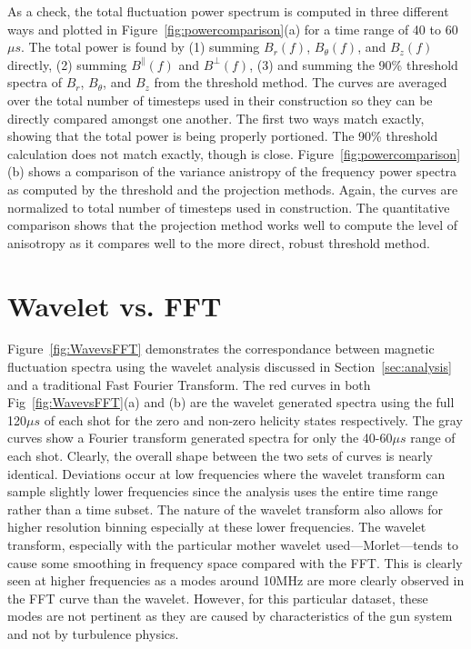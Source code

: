 \documentclass[manuscript]{aastex}
\begin{document}
As a check, the total fluctuation power spectrum is computed in three different ways and plotted in Figure~\ref{fig:powercomparison}(a) for a time range of 40 to 60$\mu s$. The total power is found by (1) summing $B_{r}(f)$, $B_{\theta}(f)$, and $B_{z}(f)$ directly, (2) summing $B^{\parallel}(f)$ and $B^{\perp}(f)$, (3) and summing the 90\% threshold spectra of $B_{r}$, $B_{\theta}$, and $B_{z}$ from the threshold method. The curves are averaged over the total number of timesteps used in their construction so they can be directly compared amongst one another. The first two ways match exactly, showing that the total power is being properly portioned. The 90\% threshold calculation does not match exactly, though is close. Figure~\ref{fig:powercomparison}(b) shows a comparison of the variance anistropy of the frequency power spectra as computed by the threshold and the projection methods. Again, the curves are normalized to total number of timesteps used in construction. The quantitative comparison shows that the projection method works well to compute the level of anisotropy as it compares well to the more direct, robust threshold method.

\section{Wavelet vs. FFT}\label{sec:WaveFFT}

Figure~\ref{fig:WavevsFFT} demonstrates the correspondance between magnetic fluctuation spectra using the wavelet analysis discussed in Section~\ref{sec:analysis} and a traditional Fast Fourier Transform. The red curves in both Fig~\ref{fig:WavevsFFT}(a) and (b) are the wavelet generated spectra using the full 120$\mu s$ of each shot for the zero and non-zero helicity states respectively. The gray curves show a Fourier transform generated spectra for only the 40-60$\mu s$ range of each shot. Clearly, the overall shape between the two sets of curves is nearly identical. Deviations occur at low frequencies where the wavelet transform can sample slightly lower frequencies since the analysis uses the entire time range rather than a time subset. The nature of the wavelet transform also allows for higher resolution binning especially at these lower frequencies. The wavelet transform, especially with the particular mother wavelet used---Morlet---tends to cause some smoothing in frequency space compared with the FFT. This is clearly seen at higher frequencies as a modes around 10MHz are more clearly observed in the FFT curve than the wavelet. However, for this particular dataset, these modes are not pertinent as they are caused by characteristics of the gun system and not by turbulence physics.
\end{document}
